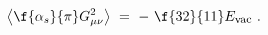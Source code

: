 \begin{equation}\label{ano}
\left\langle\f{\alpha_{s}}{\pi} G_{\mu\nu}^{2}\right\rangle ~=~ -~
\f{32}{11}E_{\mbox{\footnotesize{\textrm{vac}}}} ~.
\end{equation}


